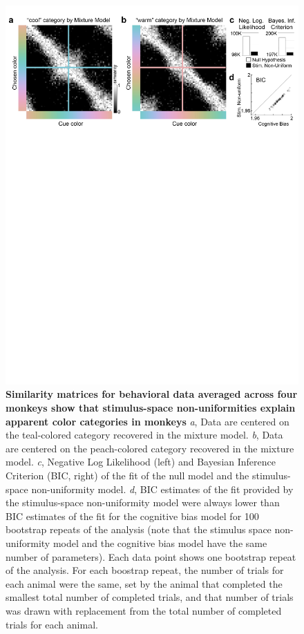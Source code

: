 \begin{figure}
    \begin{fullwidth}
    \centering
    \includegraphics[width=\textwidth+4cm,trim={0 19cm 0 0},clip]{../Figures/flat/F4_TCCResults_3.jpg}
    \caption{\textbf{Similarity matrices for behavioral data averaged across four monkeys show that stimulus-space non-uniformities explain apparent color categories in monkeys}
    \emph{a}, Data are centered on the teal-colored category recovered in the mixture model. 
	\emph{b}, Data are centered on the peach-colored category recovered in the mixture model. 
	\emph{c}, Negative Log Likelihood (left) and Bayesian Inference Criterion (BIC, right) of the fit of the null model and the stimulus-space non-uniformity model. 
	\emph{d}, BIC estimates of the fit provided by the stimulus-space non-uniformity model were always lower than BIC estimates of the fit for the cognitive bias model for 100 bootstrap repeats of the analysis (note that the stimulus space non-uniformity model and the cognitive bias model have the same number of parameters). 
	Each data point shows one bootstrap repeat of the analysis. For each boostrap repeat, the number of trials for each animal were the same, set by the animal that completed the smallest total number of completed trials, and that number of trials was drawn with replacement from the total number of completed trials for each animal. 
    } 
    \label{fig:TCCOutput}
    \end{fullwidth}
\end{figure}


